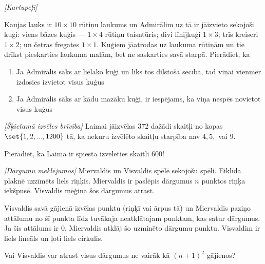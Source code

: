 

%

\renewcommand{\theenumi}{\alph{enumi}}



\noindent 

\begin{problem}
\textit{[Kartupeļi]}

Kaujas lauks ir $10 \times 10$ rūtiņu laukums un Admirālim uz tā ir jāizvieto sekojoši kuģi: viens bāzes kuģis --- $1 \times 4$ rūtiņu taisntūris; divi līnijkuģi $1\times3$; trīs kreiseri $1\times2$; un četras fregates $1\times1$. Kuģiem jāatrodas uz laukuma rūtiņām un tie drīkst pieskarties laukuma malām, bet ne saskarties savā starpā. Pierādiet, ka

\begin{enumerate}
\item Ja Admirālis sāks ar lielāko kuģi un liks tos dilstošā secībā, tad viņai vienmēr izdosies izvietot visus kuģus
\item Ja Admirālis sāks ar kādu mazāku kuģi, ir iespējams, ka viņa nespēs novietot visus kuģus
\end{enumerate}
\end{problem}
%

\begin{problem}
\textit{[Šķietamā izvēles brīvība]}
Laimai jāizvēlas $372$ dažādi skaitļi no kopas $\set{1,2,...,1200}$ tā, ka nekuru izvēlēto skaitļu starpība nav $4,5,$ vai $9$.

Pierādiet, ka Laima ir spiesta izvēlēties skaitli $600$!
\end{problem}
%


\begin{problem}
\textit{[Dārgumu meklējumos]}
Miervaldis un Visvaldis spēlē sekojošu spēli. Eiklīda plaknē uzzīmēts liels riņķis. Miervaldis ir paslēpis dārgumus $n$ punktos riņķa iekšpusē. Visvaldis mēģina šos dārgumus atrast.

Visvaldis savā gājienā izvēlas punktu (riņķī vai ārpus tā) un Miervaldis paziņo attālumu no šī punkta līdz tuvākaja neatklātajam punktam, kas satur dārgumus. Ja šis attālums ir $0$, Miervaldis atklāj šo uzminēto dārgumu punktu. Visvaldim ir liels lineāls un ļoti liels cirkulis. 

Vai Visvaldis var atrast visus dārgumus ne vairāk kā $(n+1)^2$ gājienos?
\end{problem}
%

